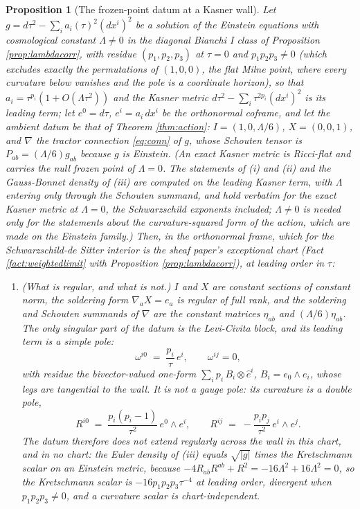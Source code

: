 \documentclass[11pt]{article}
\newtheorem{proposition}[theorem]{Proposition}
\theoremstyle{definition}
\begin{document}
\begin{proposition}[The frozen-point datum at a Kasner wall]\label{prop:kasnerwall}
Let $g = d\tau^2 - \sum_i a_i(\tau)^2(dx^i)^2$ be a solution of the Einstein equations with cosmological constant $\Lambda \neq 0$ in the diagonal Bianchi I class of Proposition \ref{prop:lambdacorr}, with residue $(p_1,p_2,p_3)$ at $\tau = 0$ and $p_1p_2p_3 \neq 0$ (which excludes exactly the permutations of $(1,0,0)$, the flat Milne point, where every curvature below vanishes and the pole is a coordinate horizon), so that $a_i = \tau^{p_i}(1 + O(\Lambda\tau^2))$ and the Kasner metric $d\tau^2 - \sum_i\tau^{2p_i}(dx^i)^2$ is its leading term; let $e^0 = d\tau$, $e^i = a_i\,dx^i$ be the orthonormal coframe, and let the ambient datum be that of Theorem \ref{thm:action}: $I = (1, 0, \Lambda/6)$, $X = (0,0,1)$, and $\nabla$ the tractor connection \eqref{eq:conn} of $g$, whose Schouten tensor is $P_{ab} = (\Lambda/6)g_{ab}$ because $g$ is Einstein. (An exact Kasner metric is Ricci-flat and carries the null frozen point of $\Lambda = 0$. The statements of (i) and (ii) and the Gauss-Bonnet density of (iii) are computed on the leading Kasner term, with $\Lambda$ entering only through the Schouten summand, and hold verbatim for the exact Kasner metric at $\Lambda = 0$, the Schwarzschild exponents included; $\Lambda \neq 0$ is needed only for the statements about the curvature-squared form of the action, which are made on the Einstein family.) Then, in the orthonormal frame, which for the Schwarzschild-de Sitter interior is the sheaf paper's exceptional chart (Fact \ref{fact:weightedlimit} with Proposition \ref{prop:lambdacorr}), at leading order in $\tau$:
\begin{enumerate}
\item[(i)] \emph{(What is regular, and what is not.)} $I$ and $X$ are constant sections of constant norm, the soldering form $\nabla_a X = e_a$ is regular of full rank, and the soldering and Schouten summands of $\nabla$ are the constant matrices $\eta_{ab}$ and $(\Lambda/6)\eta_{ab}$. The only singular part of the datum is the Levi-Civita block, and its leading term is a simple pole:
\[
\omega^{i0} \;=\; \frac{p_i}{\tau}\, e^i, \qquad \omega^{ij} = 0 ,
\]
with residue the bivector-valued one-form $\sum_i p_i\,B_i\otimes \hat e^i$, $B_i = e_0\wedge e_i$, whose legs are tangential to the wall. It is not a gauge pole: its curvature is a double pole,
\[
R^{i0} \;=\; \frac{p_i(p_i - 1)}{\tau^2}\, e^0\wedge e^i, \qquad R^{ij} \;=\; -\frac{p_i p_j}{\tau^2}\, e^i\wedge e^j .
\]
The datum therefore does not extend regularly across the wall in this chart, and in no chart: the Euler density of (iii) equals $\sqrt{|g|}$ times the Kretschmann scalar on an Einstein metric, because $-4R_{ab}R^{ab} + R^2 = -16\Lambda^2 + 16\Lambda^2 = 0$, so the Kretschmann scalar is $-16p_1p_2p_3\tau^{-4}$ at leading order, divergent when $p_1p_2p_3 \neq 0$, and a curvature scalar is chart-independent.

\end{enumerate}
\end{proposition}
\end{document}
